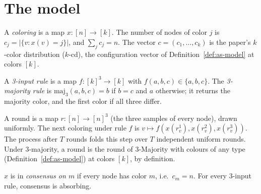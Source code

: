 \section{The model}\label{sec:model}

\begin{definition}\label{def:config}
  \leanok
  A \emph{coloring} is a map $x \colon [n] \to [k]$. The number of nodes of
  color $j$ is $c_j = |\{v : x(v) = j\}|$, and $\sum_j c_j = n$. The vector
  $c = (c_1,\dots,c_k)$ is the paper's $k$-color distribution ($k$-cd), the configuration
  vector of Definition~\ref{def:as-model} at colors $[k]$.
\end{definition}

\begin{definition}\label{def:rule}
  \leanok
  A \emph{3-input rule} is a map $f \colon [k]^3 \to [k]$ with
  $f(a,b,c) \in \{a,b,c\}$. The \emph{3-majority rule} is
  $\mathrm{maj}_3(a,b,c) = b$ if $b = c$ and $a$ otherwise; it returns the
  majority color, and the first color if all three differ.
\end{definition}

\begin{definition}\label{def:step}
  \leanok
  A round is a map $r \colon [n] \to [n]^3$ (the three samples of every node),
  drawn uniformly. The next coloring under rule $f$ is
  $v \mapsto f(x(r_v^1), x(r_v^2), x(r_v^3))$. The process after $T$ rounds
  folds this step over $T$ independent uniform rounds. Under 3-majority, a round is the round
  of 3-Majority with colours of any type (Definition~\ref{def:as-model}) at colors $[k]$, by
  definition.
\end{definition}

\begin{definition}[Consensus]\label{def:mono}
  \leanok
  $x$ is in \emph{consensus on $m$} if every node has color $m$, i.e.\
  $c_m = n$. For every 3-input rule, consensus is absorbing.
\end{definition}

